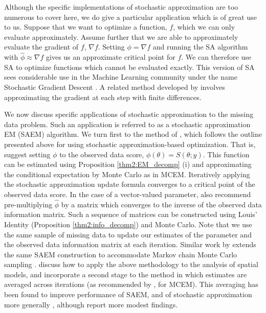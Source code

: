\documentclass[ss]{imsart}
\theoremstyle{plain}
\theoremstyle{definition}
\theoremstyle{remark}
\begin{document}
Although the specific implementations of stochastic approximation are too numerous to cover here, we do give a particular application which is of great use to us. Suppose that we want to optimize a function, $f$, which we can only evaluate approximately. Assume further that we are able to approximately evaluate the gradient of $f$, $\nabla f$. Setting $\phi = \nabla f$ and running the SA algorithm with $\hat{\phi} \approx \nabla f$ gives us an approximate critical point for $f$. We can therefore use SA to optimize functions which cannot be evaluated exactly. This version of SA sees considerable use in the Machine Learning community under the name Stochastic Gradient Descent \citep{Bot10}. A related method developed by \citet{Kie52} involves approximating the gradient at each step with finite differences.

We now discuss specific applications of stochastic approximation to the missing data problem. Such an application is referred to as a stochastic approximation EM (SAEM) algorithm. We turn first to the method of \citet{Gu98I}, which follows the outline presented above for using stochastic approximation-based optimization. That is, \citeauthor{Gu98I} suggest setting $\phi$ to the observed data score, $\phi(\theta) = S(\theta; y)$. This function can be estimated using Proposition \ref{thm2:EM_decomp} (i) and approximating the conditional expectation by Monte Carlo as in MCEM. Iteratively applying the stochastic approximation update formula converges to a critical point of the observed data score. In the case of a vector-valued parameter, \citeauthor{Gu98I} also recommend pre-multiplying $\hat{\phi}$ by a matrix which converges to the inverse of the observed data information matrix. Such a sequence of matrices can be constructed using Louis' Identity (Proposition \ref{thm2:info_decomp}) and Monte Carlo. Note that we use the same sample of missing data to update our estimates of the parameter and the observed data information matrix at each iteration. Similar work by \citet{Gu98II} extends the same SAEM construction to accommodate Markov chain Monte Carlo sampling \citep[see also][]{Cai10}. \citet{Gu01} discuss how to apply the above methodology to the analysis of spatial models, and incorporate a second stage to the method in which estimates are averaged across iterations (as recommended by \citealp{For03}, for MCEM). This averaging has been found to improve performance of SAEM, and of stochastic approximation more generally \citep{Pol92, Del99}, although \citet{Kuh05} report more modest findings.
\end{document}
